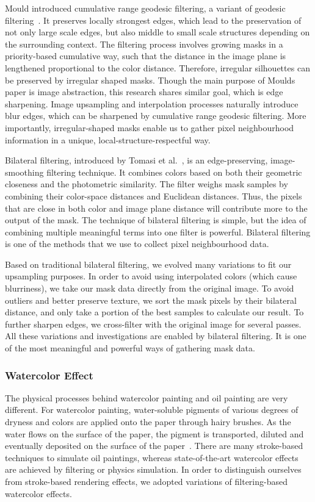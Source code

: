 Mould introduced cumulative range geodesic filtering, a variant of geodesic filtering~\cite{David:geo, Mould2}. It preserves locally strongest edges, which lead to the preservation of not only large scale edges, but also middle to small scale structures depending on the surrounding context. The filtering process involves growing masks in a priority-based cumulative way, such that the distance in the image plane is lengthened proportional to the color distance. Therefore, irregular silhouettes can be preserved by irregular shaped masks. Though the main purpose of Mould\textquotesingle s paper is image abstraction, this research shares similar goal, which is edge sharpening. Image upsampling and interpolation processes naturally introduce blur edges, which can be sharpened by cumulative range geodesic filtering. More importantly, irregular-shaped masks enable us to gather pixel neighbourhood information in a unique, local-structure-respectful way. 

Bilateral filtering, introduced by Tomasi et al.~\cite{Tomasi:bilateral}, is an edge-preserving, image-smoothing filtering technique. It combines colors based on both their geometric closeness and the photometric similarity. The filter weighs mask samples by combining their color-space distances and Euclidean distances. Thus, the pixels that are close in both color and image plane distance will contribute more to the output of the mask. The technique of bilateral filtering is simple, but the idea of combining multiple meaningful terms into one filter is powerful. Bilateral filtering is one of the methods that we use to collect pixel neighbourhood data.

Based on traditional bilateral filtering, we evolved many variations to fit our upsampling purposes. In order to avoid using interpolated colors (which cause blurriness), we take our mask data directly from the original image. To avoid outliers and better preserve texture, we sort the mask pixels by their bilateral distance, and only take a portion of the best samples to calculate our result. To further sharpen edges, we cross-filter with the original image for several passes. All these variations and investigations are enabled by bilateral filtering. It is one of the most meaningful and powerful ways of gathering mask data.

\subsubsection{Watercolor Effect}
The physical processes behind watercolor painting and oil painting are very different. For watercolor painting, water-soluble pigments of various degrees of dryness and colors are applied onto the paper through hairy brushes. As the water flows on the surface of the paper, the pigment is transported, diluted and eventually deposited on the surface of the paper~\cite{NPRbook}. There are many stroke-based techniques to simulate oil paintings, whereas state-of-the-art watercolor effects are achieved by filtering or physics simulation. In order to distinguish ourselves from stroke-based rendering effects, we adopted variations of filtering-based watercolor effects. 

